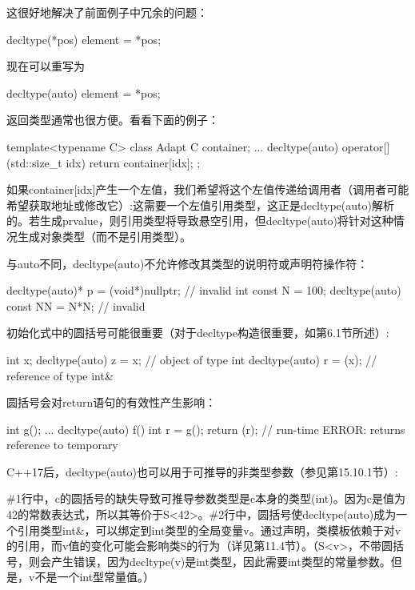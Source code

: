 这很好地解决了前面例子中冗余的问题：

\begin{cpp}
decltype(*pos) element = *pos;
\end{cpp}

现在可以重写为

\begin{cpp}
decltype(auto) element = *pos;
\end{cpp}

返回类型通常也很方便。看看下面的例子：

\begin{cpp}
template<typename C> class Adapt
{
	C container;
	...
	decltype(auto) operator[] (std::size_t idx) {
		return container[idx];
	}
};
\end{cpp}

如果container[idx]产生一个左值，我们希望将这个左值传递给调用者（调用者可能希望获取地址或修改它）:这需要一个左值引用类型，这正是decltype(auto)解析的。若生成prvalue，则引用类型将导致悬空引用，但decltype(auto)将针对这种情况生成对象类型（而不是引用类型）。

与auto不同，decltype(auto)不允许修改其类型的说明符或声明符操作符：

\begin{cpp}
decltype(auto)* p = (void*)nullptr; // invalid
int const N = 100;
decltype(auto) const NN = N*N; // invalid
\end{cpp}

初始化式中的圆括号可能很重要（对于decltype构造很重要，如第6.1节所述）:

\begin{cpp}
int x;
decltype(auto) z = x; // object of type int
decltype(auto) r = (x); // reference of type int&
\end{cpp}

圆括号会对return语句的有效性产生影响：

\begin{cpp}
int g();
...
decltype(auto) f() {
	int r = g();
	return (r); // run-time ERROR: returns reference to temporary
}
\end{cpp}

C++17后，decltype(auto)也可以用于可推导的非类型参数（参见第15.10.1节）:


\#1行中，c的圆括号的缺失导致可推导参数类型是c本身的类型(int)。因为c是值为42的常数表达式，所以其等价于S<42>。\#2行中，圆括号使decltype(auto)成为一个引用类型int\&，可以绑定到int类型的全局变量v。通过声明，类模板依赖于对v的引用，而v值的变化可能会影响类S的行为（详见第11.4节）。（S<v>，不带圆括号，则会产生错误，因为decltype(v)是int类型，因此需要int类型的常量参数。但是，v不是一个int型常量值。）

